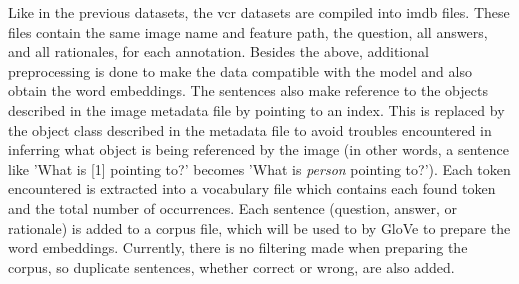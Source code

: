 Like in the previous datasets, the \gls{vcr} datasets are compiled into \gls{imdb} files. These files contain the same image name and feature path, the question, all answers, and all rationales, for each annotation.
Besides the above, additional preprocessing is done to make the data compatible with the model and also obtain the word embeddings.
The sentences also make reference to the objects described in the image metadata file by pointing to an index.
This is replaced by the object class described in the metadata file to avoid troubles encountered in inferring what object is being referenced by the image (in other words, a sentence like 'What is [1] pointing to?' becomes 'What is \textit{person} pointing to?').
Each token encountered is extracted into a vocabulary file which contains each found token and the total number of occurrences.
Each sentence (question, answer, or rationale) is added to a \gls{corpus} file, which will be used to by GloVe to prepare the word embeddings.
Currently, there is no filtering made when preparing the corpus, so duplicate sentences, whether correct or wrong, are also added.


